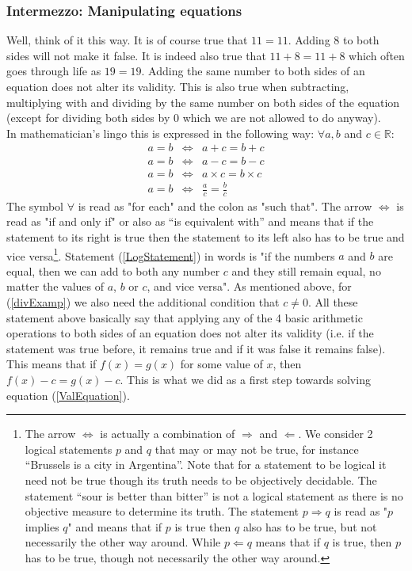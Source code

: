 \subsubsection{Intermezzo: Manipulating equations}
\noindent Well, think of it this way. It is of course true that $11=11$. Adding $8$ to both sides will not make it false. It is indeed also true that $11+8 = 11+8$ which often goes through life as $19=19$. Adding the same number to both sides of an equation does not alter its validity. This is also true when subtracting, multiplying with and dividing by the same number on both sides of the equation (except for dividing both sides by $0$ which we are not allowed to do anyway).\\ 

\noindent  In mathematician's lingo this is expressed in the following way: $\forall a, b$ and $c \in \mathbb{R}$:
\begin{eqnarray}
\label{LogStatement} a = b & \Leftrightarrow & a + c = b + c \\
a = b & \Leftrightarrow & a - c = b - c \\
a = b & \Leftrightarrow & a \times c = b \times c \\
\label{divExamp} a = b & \Leftrightarrow & \frac{a}{c} = \frac{b}{c}
\end{eqnarray}
\noindent The symbol $\forall$ is read as "for each" and the colon as "such that". The arrow $\Leftrightarrow$ is read as "if and only if" or also as "`is equivalent with"' and means that if the statement to its right is true then the statement to its left also has to be true and vice versa\footnote{The arrow $\Leftrightarrow$ is actually a combination of $\Rightarrow$ and $\Leftarrow$. We consider 2 logical statements $p$ and $q$ that may or may not be true, for instance "`Brussels is a city in Argentina"'. Note that for a statement to be logical it need not be true though its truth needs to be objectively decidable. The statement "`sour is better than bitter"' is not a logical statement as there is no objective measure to determine its truth. The statement $p \Rightarrow q$ is read as "$p$ implies $q$" and means that if $p$ is true then $q$ also has to be true, but not necessarily the other way around. While $p \Leftarrow q$ means that if $q$ is true, then $p$ has to be true, though not necessarily the other way around.}. Statement (\ref{LogStatement}) in words is "if the numbers $a$ and $b$ are equal, then we can add to both any number $c$ and they still remain equal, no matter the values of $a$, $b$ or $c$, and vice versa". As mentioned above, for (\ref{divExamp}) we also need the additional condition that $c \neq 0$. All these statement above basically say that applying any of the 4 basic arithmetic operations to both sides of an equation does not alter its validity (i.e. if the statement was true before, it remains true and if it was false it remains false). This means that if $f(x) = g(x)$ for some value of $x$, then $f(x) - c = g(x) - c$. This is what we did as a first step towards solving equation (\ref{ValEquation}).\\
 
